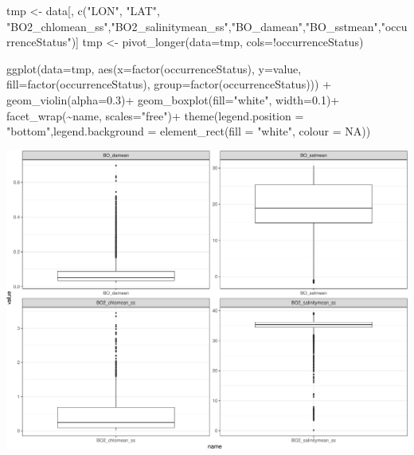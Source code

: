 \documentclass[
]{book}
\newenvironment{Shaded}{\begin{snugshade}}{\end{snugshade}}
\newcommand{\AttributeTok}[1]{\textcolor[rgb]{0.77,0.63,0.00}{#1}}
\newcommand{\ConstantTok}[1]{\textcolor[rgb]{0.00,0.00,0.00}{#1}}
\newcommand{\FloatTok}[1]{\textcolor[rgb]{0.00,0.00,0.81}{#1}}
\newcommand{\FunctionTok}[1]{\textcolor[rgb]{0.00,0.00,0.00}{#1}}
\newcommand{\NormalTok}[1]{#1}
\newcommand{\OtherTok}[1]{\textcolor[rgb]{0.56,0.35,0.01}{#1}}
\newcommand{\SpecialCharTok}[1]{\textcolor[rgb]{0.00,0.00,0.00}{#1}}
\newcommand{\StringTok}[1]{\textcolor[rgb]{0.31,0.60,0.02}{#1}}
\begin{document}
\begin{Shaded}
\begin{Highlighting}[]
\NormalTok{tmp }\OtherTok{\textless{}{-}}\NormalTok{ data[, }\FunctionTok{c}\NormalTok{(}\StringTok{"LON"}\NormalTok{, }\StringTok{"LAT"}\NormalTok{, }\StringTok{"BO2\_chlomean\_ss"}\NormalTok{,}\StringTok{"BO2\_salinitymean\_ss"}\NormalTok{,}\StringTok{"BO\_damean"}\NormalTok{,}\StringTok{"BO\_sstmean"}\NormalTok{,}\StringTok{"occurrenceStatus"}\NormalTok{)]}
\NormalTok{tmp }\OtherTok{\textless{}{-}} \FunctionTok{pivot\_longer}\NormalTok{(}\AttributeTok{data=}\NormalTok{tmp, }\AttributeTok{cols=}\SpecialCharTok{!}\NormalTok{occurrenceStatus) }

\FunctionTok{ggplot}\NormalTok{(}\AttributeTok{data=}\NormalTok{tmp, }\FunctionTok{aes}\NormalTok{(}\AttributeTok{x=}\FunctionTok{factor}\NormalTok{(occurrenceStatus), }\AttributeTok{y=}\NormalTok{value, }\AttributeTok{fill=}\FunctionTok{factor}\NormalTok{(occurrenceStatus), }\AttributeTok{group=}\FunctionTok{factor}\NormalTok{(occurrenceStatus))) }\SpecialCharTok{+} 
  \FunctionTok{geom\_violin}\NormalTok{(}\AttributeTok{alpha=}\FloatTok{0.3}\NormalTok{)}\SpecialCharTok{+}
  \FunctionTok{geom\_boxplot}\NormalTok{(}\AttributeTok{fill=}\StringTok{"white"}\NormalTok{, }\AttributeTok{width=}\FloatTok{0.1}\NormalTok{)}\SpecialCharTok{+}
  \FunctionTok{facet\_wrap}\NormalTok{(}\SpecialCharTok{\textasciitilde{}}\NormalTok{name, }\AttributeTok{scales=}\StringTok{"free"}\NormalTok{)}\SpecialCharTok{+}
  \FunctionTok{theme}\NormalTok{(}\AttributeTok{legend.position =} \StringTok{"bottom"}\NormalTok{,}\AttributeTok{legend.background =} \FunctionTok{element\_rect}\NormalTok{(}\AttributeTok{fill =} \StringTok{"white"}\NormalTok{, }\AttributeTok{colour =} \ConstantTok{NA}\NormalTok{))}
\end{Highlighting}
\end{Shaded}

\includegraphics{_main_files/figure-latex/unnamed-chunk-49-1.pdf}
\end{document}
